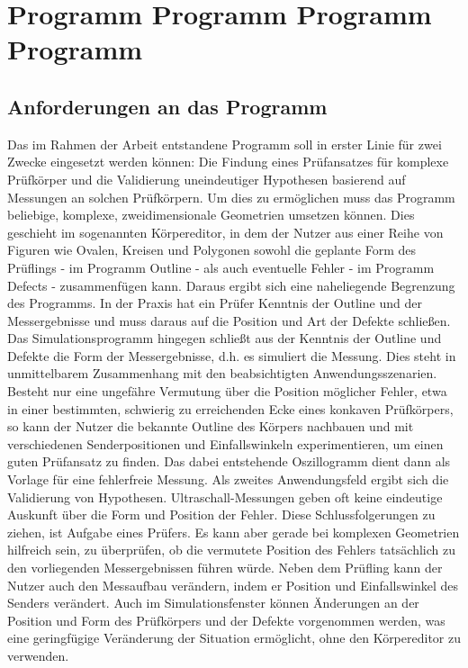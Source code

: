 \documentclass[reducespace,stylepage,semiarbeit]{spezidoc}
\begin{document}
\section{Programm Programm Programm Programm } %

\subsection{Anforderungen an das Programm}

Das im Rahmen der Arbeit entstandene Programm soll in erster Linie für zwei Zwecke eingesetzt werden können: Die Findung eines Prüfansatzes für komplexe Prüfkörper und die Validierung uneindeutiger Hypothesen basierend auf Messungen an solchen Prüfkörpern.
Um dies zu ermöglichen muss das Programm beliebige, komplexe, zweidimensionale Geometrien umsetzen können. 
Dies geschieht im sogenannten Körpereditor, in dem der Nutzer aus einer Reihe von Figuren wie Ovalen, Kreisen und Polygonen sowohl die geplante Form des Prüflings - im Programm Outline - als auch eventuelle Fehler - im Programm Defects - zusammenfügen kann.
Daraus ergibt sich eine naheliegende Begrenzung des Programms. 
In der Praxis hat ein Prüfer Kenntnis der Outline und der Messergebnisse und muss daraus auf die Position und Art der Defekte schließen. 
Das Simulationsprogramm hingegen schließt aus der Kenntnis der Outline und Defekte die Form der Messergebnisse, d.h. 
es simuliert die Messung. 
Dies steht in unmittelbarem Zusammenhang mit den beabsichtigten Anwendungsszenarien.
Besteht nur eine ungefähre Vermutung über die Position möglicher Fehler, etwa in einer bestimmten, schwierig zu erreichenden Ecke eines konkaven Prüfkörpers, %
so kann der Nutzer die bekannte Outline des Körpers nachbauen und mit verschiedenen Senderpositionen und Einfallswinkeln experimentieren, um einen guten Prüfansatz zu finden. 
Das dabei entstehende Oszillogramm dient dann als Vorlage für eine fehlerfreie Messung.
Als zweites Anwendungsfeld ergibt sich die Validierung von Hypothesen. 
Ultraschall-Messungen geben oft keine eindeutige Auskunft über die Form und Position der Fehler. 
Diese Schlussfolgerungen zu ziehen, ist Aufgabe eines Prüfers. 
Es kann aber gerade bei komplexen Geometrien hilfreich sein, zu überprüfen, ob die vermutete Position des Fehlers tatsächlich zu den vorliegenden Messergebnissen führen würde.
Neben dem Prüfling kann der Nutzer auch den Messaufbau verändern, indem er Position und Einfallswinkel des Senders verändert. 
Auch im Simulationsfenster können Änderungen an der Position und Form des Prüfkörpers und der Defekte vorgenommen werden, was eine geringfügige Veränderung der Situation ermöglicht, ohne den Körpereditor zu verwenden.
\end{document}
